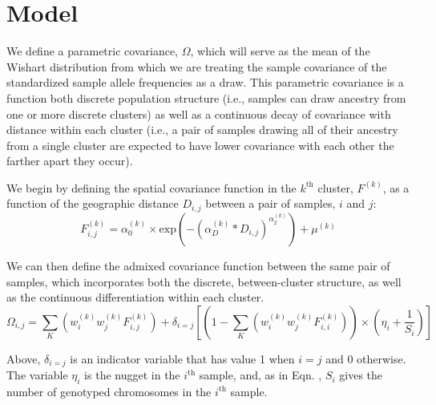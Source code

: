 \documentclass[12pt]{article}
\begin{document}
\newpage
\section{Model}
We define a parametric covariance, $\Omega$, which will serve as 
the mean of the Wishart distribution from which we are treating 
the sample covariance of the standardized sample allele frequencies 
as a draw.  This parametric covariance is a function both discrete population 
structure (i.e., samples can draw ancestry from one or more discrete clusters) 
as well as a continuous decay of covariance with distance within each cluster 
(i.e., a pair of samples drawing all of their ancestry from a single cluster are expected 
to have lower covariance with each other the farther apart they occur).

We begin by defining the spatial covariance function in the $k^{\text{th}}$ cluster, $F^{(k)}$, 
as a function of the geographic distance $D_{i,j}$ between a pair of samples, $i$ and $j$:
\begin{equation}
F^{(k)}_{i,j} = \alpha^{(k)}_0 \times \text{exp} \left(-\left( \alpha^{(k)}_D * D_{i,j}	\right)^{\alpha^{(k)}_2}	\right) + \mu^{(k)}
\label{spatial_cov}
\end{equation}

We can then define the admixed covariance function between the same pair of samples, 
which incorporates both the discrete, between-cluster structure, as well as the continuous 
differentiation within each cluster.
\begin{equation}
\Omega_{i,j} = \sum\limits_K \left(	w^{(k)}_iw^{(k)}_j F^{(k)}_{i,j} \right) + 
	\delta_{i=j} \left[
		\left(1-\sum\limits_K \left(	w^{(k)}_iw^{(k)}_j F^{(k)}_{i,i}\right)\right) \times 
		\left( \eta_i + \frac{1}{S_i} \right)
			\right]
\label{ad_cov_spMultiK}
\end{equation}

Above, $\delta_{i=j}$ is an indicator variable that has value 1 when $i=j$ and 0 otherwise.
The variable $\eta_i$ is the nugget in the $i^{\text{th}}$ sample, and, as in Eqn. , 
$S_i$ gives the number of genotyped chromosomes in the $i^{\text{th}}$ sample.
\end{document}

